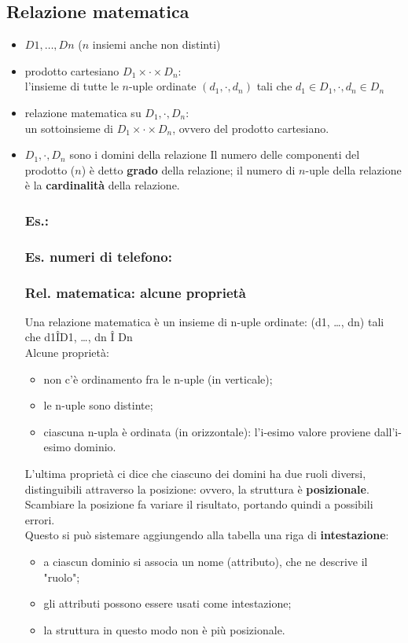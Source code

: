\subsection{Relazione matematica}
\begin{itemize}
    \item $D1, …, Dn$ ($n$ insiemi anche non distinti)
    \item prodotto cartesiano $D_1 \times \cdot \times D_n$:
    \\l'insieme di tutte le $n$-uple ordinate $(d_1, \cdot, d_n)$ tali che $d_1 \in D_1, \cdot, d_n \in D_n$
    \item relazione matematica su $D_1, \cdot, D_n$:
    \\un sottoinsieme di $D_1 \times \cdot \times D_n$, ovvero del prodotto cartesiano.
    \item $D_1, \cdot, D_n$ sono i domini della relazione
Il numero delle componenti del prodotto ($n$) è detto \textbf{grado} della relazione; il numero di $n$-uple della relazione è la \textbf{cardinalità} della relazione.

\subsubsection{Es.:}

\subsubsection{Es. numeri di telefono:}

\subsubsection{Rel. matematica: alcune proprietà}
Una relazione matematica è un insieme di n-uple ordinate: (d1, …, dn) tali che d1ÎD1, …, dn Î Dn
\\Alcune proprietà:
\begin{itemize}
    \item non c'è ordinamento fra le n-uple (in verticale);
    \item le n-uple sono distinte;
    \item ciascuna n-upla è ordinata (in orizzontale): l'i-esimo valore proviene dall'i-esimo dominio.
\end{itemize}
L'ultima proprietà ci dice che ciascuno dei domini ha due ruoli diversi, distinguibili attraverso la posizione: ovvero, la struttura è \textbf{posizionale}. Scambiare la posizione fa variare il risultato, portando quindi a possibili errori.
\\Questo si può sistemare aggiungendo alla tabella una riga di \textbf{intestazione}:
\begin{itemize}
    \item a ciascun dominio si associa un nome (attributo), che ne descrive il "ruolo";
    \item gli attributi possono essere usati come intestazione;
    \item la struttura in questo modo non è più posizionale.
\end{itemize}


\end{itemize}
